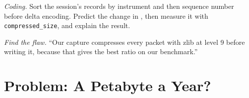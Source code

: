 \begin{exercise}[$\star\star\star$]\label{exo:pl:capturing-and-storing-tick-data:7}
\emph{Coding.} Sort the session's records by instrument and then sequence number before delta encoding. Predict the change in
, then measure it with \texttt{compressed\_size}, and explain the result.
\end{exercise}

\begin{exercise}[$\star\star\star$]\label{exo:pl:capturing-and-storing-tick-data:8}
\emph{Find the flaw.} ``Our capture compresses every packet with zlib at level 9 before writing it, because that gives the best
ratio on our benchmark.''
\end{exercise}

\section{Problem: A Petabyte a Year?}

